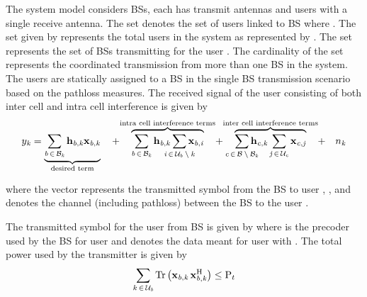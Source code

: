 
The system model considers  BSs, each has  transmit antennas and  users with a single receive antenna. The set  denotes the set of users linked to BS  where . The set  given by  represents the total users in the system as represented by . The set  represents the set of BSs transmitting for the user . The cardinality of the set  represents the coordinated transmission from more than one BS in the system. The users are statically assigned to a BS in the single BS transmission scenario based on the pathloss measures. The received signal  of the user  consisting of both inter cell and intra cell interference is given by
\begin{eqnarray}
\msclxy{y}{k} = \underbrace{\sum_{\mtext{b} \inm \mcxy{B}{k}} \mvecxyz{h}{b}{k} \mvecxyz{x}{b}{k}}_{\mathclap{\text{desired term}}} \quad + \quad \overbrace{\sum_{\mtext{b} \inm \mcxy{B}{k}} \mvecxyz{h}{b}{k} \sum_{\mathclap{\mtext{i} \inm \mcxy{U}{b} \bs \mtext{k}}} \mvecxyz{x}{b}{i}}^{\mathclap{\text{intra cell interference terms}}} \quad + \quad \overbrace{\sum_{\mathclap{\mtext{c} \inm \mc{B} \bs \mcxy{B}{k}}} \mvecxyz{h}{c}{k} \sum_{\mtext{j} \inm \mcxy{U}{c}} \mvecxyz{x}{c}{j}}^{\mathclap{\text{inter cell interference terms}}} \quad + \quad \msclxy{n}{k}
\label{sm-e1}
\end{eqnarray}

where the vector  represents the transmitted symbol from the BS  to user , , and  denotes the channel (including pathloss) between the BS  to the user .

The transmitted symbol  for the user  from BS  is given by  where  is the precoder used by the BS  for user  and  denotes the data meant for user  with . The total power used by the transmitter is given by
\begin{equation}
\sum_{k \, \in \, \mathcal{U}_{\mathit{b}}} \mathrm{Tr} \left ( \mathbf{x}_{\mathit{b},\mathit{k}} \, \mathbf{x}_{\mathit{b},\mathit{k}}^{\mathrm{H}} \right ) \leq \mathrm{P}_{t}
\label{sm-e2}
\end{equation}

